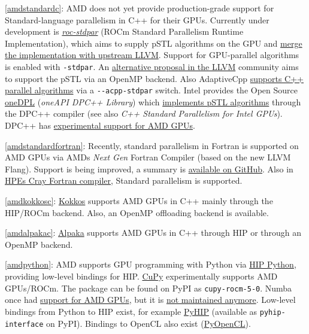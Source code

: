\item \ref{amdstandardc}: AMD does not yet provide production-grade support for Standard-language parallelism in C++ for their GPUs. Currently under development is \href{https://github.com/ROCmSoftwarePlatform/roc-stdpar}{\emph{roc-stdpar}} (ROCm Standard Parallelism Runtime Implementation), which aims to supply pSTL algorithms on the GPU and \href{https://discourse.llvm.org/t/rfc-adding-c-parallel-algorithm-offload-support-to-clang-llvm/72159}{merge the implementation with upstream LLVM}. Support for GPU-parallel algorithms is enabled with \texttt{-stdpar}. An \href{https://discourse.llvm.org/t/rfc-openmp-offloading-backend-for-c-parallel-algorithms/73468}{alternative proposal in the LLVM} community aims to support the pSTL via an OpenMP backend. Also AdaptiveCpp \href{https://github.com/AdaptiveCpp/AdaptiveCpp/blob/develop/doc/stdpar.md}{supports C++ parallel algorithms} via a \texttt{-\/-acpp-stdpar} switch. Intel provides the Open Source \href{https://github.com/oneapi-src/oneDPL}{oneDPL} (\emph{oneAPI DPC++ Library}) which \href{https://oneapi-src.github.io/oneDPL/parallel_api_main.html}{implements pSTL algorithms} through the DPC++ compiler (see also \emph{C++ Standard Parallelism for Intel GPUs}). DPC++ has \href{https://intel.github.io/llvm-docs/GetStartedGuide.html\#build-dpc-toolchain-with-support-for-hip-amd}{experimental support for AMD GPUs}.
\item \ref{amdstandardfortran}: Recently, standard parallelism in Fortran is supported on AMD GPUs via AMD\textquotesingle s \emph{Next Gen} Fortran Compiler (based on the new LLVM Flang). Support is being improved, a summary is \href{https://github.com/amd/InfinityHub-CI/blob/main/fortran/README.md}{available on GitHub}. Also in \href{https://support.hpe.com/hpesc/public/docDisplay?docId=dp00005037en_us&docLocale=en_US}{HPE\textquotesingle s Cray Fortran compiler}, Standard parallelism is supported.
\item \ref{amdkokkosc}: \href{https://github.com/kokkos/kokkos}{Kokkos} supports AMD GPUs in C++ mainly through the HIP/ROCm backend. Also, an OpenMP offloading backend is available.
\item \ref{amdalpakac}: \href{https://github.com/alpaka-group/alpaka}{Alpaka} supports AMD GPUs in C++ through HIP or through an OpenMP backend.
\item \ref{amdpython}: AMD supports GPU programming with Python via \href{https://github.com/ROCm/hip-python}{HIP Python}, providing low-level bindings for HIP. \href{https://docs.cupy.dev/en/latest/install.html\#using-cupy-on-amd-gpu-experimental}{CuPy} experimentally supports AMD GPUs/ROCm. The package can be found on PyPI as \texttt{cupy-rocm-5-0}. Numba once had \href{https://numba.pydata.org/numba-doc/latest/roc/index.html}{support for AMD GPUs}, but it is \href{https://numba.readthedocs.io/en/stable/release-notes.html\#version-0-54-0-19-august-2021}{not maintained anymore}. Low-level bindings from Python to HIP exist, for example \href{https://github.com/jatinx/PyHIP}{PyHIP} (available as \texttt{pyhip-interface} on PyPI). Bindings to OpenCL also exist (\href{https://documen.tician.de/pyopencl/}{PyOpenCL}).
